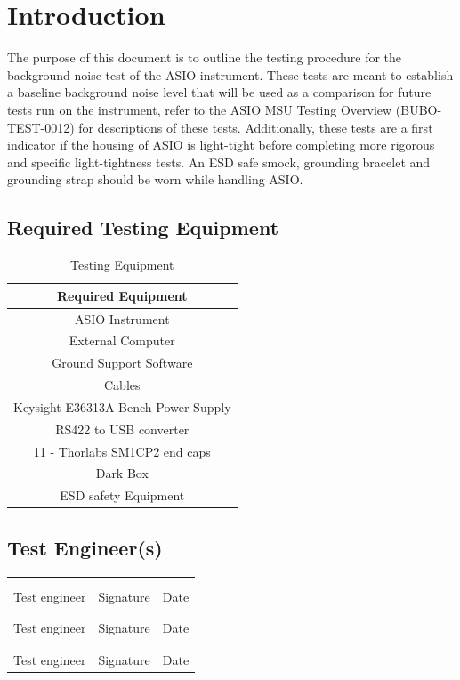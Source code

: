 
\section{Introduction}
The purpose of this document is to outline the testing procedure for the background noise test
of the ASIO instrument. These tests are meant to establish a baseline background noise level
that will be used as a comparison for future tests run on the instrument, refer to the ASIO
MSU Testing Overview (BUBO-TEST-0012) for descriptions of these tests. Additionally, these
tests are a first indicator if the housing of ASIO is light-tight before completing more rigorous
and specific light-tightness tests. An ESD safe smock, grounding bracelet and grounding strap
should be worn while handling ASIO.

\subsection{Required Testing Equipment}
\begin{table}[h!]
	\centering \caption{Testing Equipment}
	\begin{tabular}{|c|}
		\hline
		\textbf{Required Equipment} \\
		\hline
	ASIO Instrument \\
        External Computer \\
        Ground Support Software \\
        Cables \\
        Keysight E36313A Bench Power Supply \\
        RS422 to USB converter \\
        11 -  Thorlabs SM1CP2 end caps \\
        Dark Box \\
        ESD safety Equipment \\
        \hline
	\end{tabular}
\end{table}

\subsection{Test Engineer(s)}
\begin{table}[H]
	\centering
	\begin{tabular}{p{2in} p{2in} p{2in}}
		& & \\
		& & \\ \hline
		Test engineer & Signature & Date \\
		& & \\
		& & \\ \hline
            Test engineer & Signature & Date \\
            & & \\
		& & \\ \hline
            Test engineer & Signature & Date \\
	\end{tabular}
\end{table}

